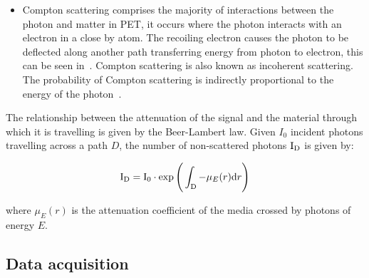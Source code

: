 \begin{itemize}
                    \item Compton scattering comprises the majority of interactions between the photon and matter in \gls{PET}, it occurs where the photon interacts with an electron in a close by atom. The recoiling electron causes the photon to be deflected along another path transferring energy from photon to electron, this can be seen in~. Compton scattering is also known as incoherent scattering. The probability of Compton scattering is indirectly proportional to the energy of the photon~.
                \end{itemize}
                
                The relationship between the attenuation of the signal and the material through which it is travelling is given by the Beer-Lambert law. Given $I_0$ incident photons travelling across a path $D$, the number of non-scattered photons $\mathrm{I}_{\mathrm{D}}$ is given by: %
                 
                \begin{equation} \label{sec:eq:beer_lambert_law}
                    \rmI_{\rmD} = \rmI_{0} \cdot \exp\Bigg(\int_{\rmD} - \mu_E(r)\rmd r \Bigg) %
                \end{equation}

                \noindent where $\mu_E(r)$ is the attenuation coefficient of the media crossed by photons of energy $E$.
        
        \subsection{Data acquisition} \label{sec:data_acquisition}
            
